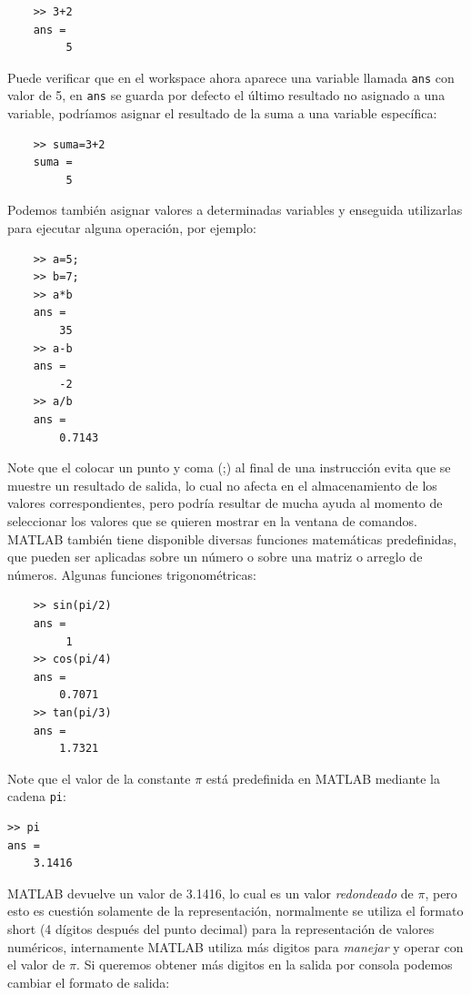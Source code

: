 \begin{verbatim}
	>> 3+2
	ans =
	     5
\end{verbatim}

Puede verificar que en el workspace ahora aparece una variable llamada \texttt{ans} con valor de 5, 
en \texttt{ans} se guarda por defecto el último resultado no asignado a una variable, podríamos asignar 
el resultado de la suma a una variable específica:

\begin{verbatim}
	>> suma=3+2
	suma =
	     5
\end{verbatim}

Podemos también asignar valores a determinadas variables y enseguida utilizarlas para ejecutar 
alguna operación, por ejemplo:

\begin{verbatim}
	>> a=5;
	>> b=7;
	>> a*b
	ans =
	    35
	>> a-b
	ans =
	    -2
	>> a/b
	ans =
	    0.7143
\end{verbatim}

Note que el colocar un punto y coma (;) al final de una instrucción evita que se muestre un resultado de salida, 
lo cual no afecta en el almacenamiento de los valores correspondientes, pero podría resultar de mucha ayuda al 
momento de seleccionar los valores que se quieren mostrar en la ventana de comandos.\\

MATLAB también tiene disponible diversas funciones matemáticas predefinidas, que pueden ser aplicadas 
sobre un número o sobre una matriz o arreglo de números. Algunas funciones trigonométricas:

\begin{verbatim}
	>> sin(pi/2)
	ans =
	     1
	>> cos(pi/4)
	ans =
	    0.7071
	>> tan(pi/3)
	ans =
	    1.7321
\end{verbatim}

Note que el valor de la constante $\pi$ está predefinida en MATLAB mediante la cadena \texttt{pi}:

\begin{verbatim}
>> pi
ans =
    3.1416
\end{verbatim}

MATLAB devuelve un valor de 3.1416, lo cual es un valor \textit{redondeado} de $\pi$, pero esto 
es cuestión solamente de la representación, normalmente se utiliza el formato short (4 dígitos después
del punto decimal) para la representación de valores numéricos, internamente MATLAB utiliza más 
digitos para \textit{manejar} y operar con el valor de $\pi$. Si queremos obtener más digitos en 
la salida por consola podemos cambiar el formato de salida:

